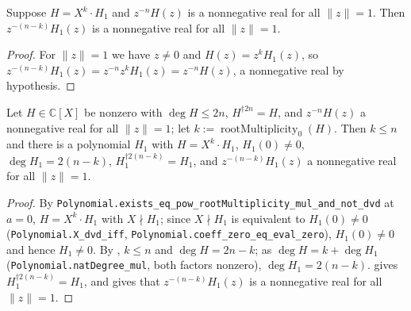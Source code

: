 \begin{lemma}
    \label{lem:fr-zero-factor-nonneg}
    \leanok
    Suppose $H = X^{k}\cdot H_1$ and $z^{-n}H(z)$ is a nonnegative real for all
    $\|z\| = 1$. Then $z^{-(n-k)}H_1(z)$ is a nonnegative real for all
    $\|z\| = 1$.
\end{lemma}
\begin{proof}
    For $\|z\| = 1$ we have $z \neq 0$ and $H(z) = z^{k} H_1(z)$, so
    $z^{-(n-k)} H_1(z) = z^{-n} z^{k} H_1(z) = z^{-n} H(z)$, a nonnegative real
    by hypothesis.
\end{proof}

\begin{lemma}
    \label{lem:fr-zero-factor}
    \leanok
    Let $H \in \mathbb{C}[X]$ be nonzero with $\deg H \le 2n$, $H^{\dagger 2n} = H$,
    and $z^{-n}H(z)$ a nonnegative real for all $\|z\| = 1$; let
    $k := \operatorname{rootMultiplicity}_0(H)$. Then $k \le n$ and there is a
    polynomial $H_1$ with $H = X^{k}\cdot H_1$, $H_1(0) \neq 0$,
    $\deg H_1 = 2(n-k)$, $H_1^{\dagger 2(n-k)} = H_1$, and $z^{-(n-k)}H_1(z)$ a
    nonnegative real for all $\|z\| = 1$.
\end{lemma}
\begin{proof}
    By \texttt{Polynomial.exists\_eq\_pow\_rootMultiplicity\_mul\_and\_not\_dvd}
    at $a = 0$, $H = X^{k}\cdot H_1$ with $X \nmid H_1$; since $X \nmid H_1$ is
    equivalent to $H_1(0) \neq 0$ (\texttt{Polynomial.X\_dvd\_iff},
    \texttt{Polynomial.coeff\_zero\_eq\_eval\_zero}), $H_1(0) \neq 0$ and hence
    $H_1 \neq 0$. By , $k \le n$ and $\deg H = 2n - k$;
    as $\deg H = k + \deg H_1$ (\texttt{Polynomial.natDegree\_mul}, both factors
    nonzero), $\deg H_1 = 2(n-k)$.  gives
    $H_1^{\dagger 2(n-k)} = H_1$, and  gives that
    $z^{-(n-k)}H_1(z)$ is a nonnegative real for all $\|z\| = 1$.
\end{proof}

